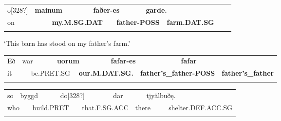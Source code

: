 \begin{tabular}{llllllllll}
\lsptoprule
o[328?] & \multicolumn{2}{l}{{\bfseries mainum}

} & \multicolumn{2}{l}{{\bfseries faðer-es }

} & \multicolumn{2}{l}{{\bfseries garde.}

} & \multicolumn{2}{l}{} & \\
\multicolumn{2}{l}{on

} & \multicolumn{2}{l}{{\bfseries my.M.SG.DAT}

} & \multicolumn{2}{l}{{\bfseries father-POSS}

} & \multicolumn{2}{l}{{\bfseries farm.DAT.SG}

} & \multicolumn{2}{l}{}\\
\lspbottomrule
\end{tabular}

\begin{styleTranslation}
‘This barn has stood on my father’s farm.’

\end{styleTranslation}

\begin{tabular}{llllllllll}
\lsptoprule
Eð & \multicolumn{2}{l}{war

} & \multicolumn{2}{l}{{\bfseries uorum}

} & \multicolumn{2}{l}{{\bfseries fafar-es}

} & \multicolumn{2}{l}{{\bfseries fafar}

} & \\
\multicolumn{2}{l}{it

} & \multicolumn{2}{l}{be.PRET.SG

} & \multicolumn{2}{l}{{\bfseries our.M.DAT.SG.}

} & \multicolumn{2}{l}{{\bfseries father’s\_father-POSS}

} & \multicolumn{2}{l}{{\bfseries father’s\_father}

}\\
\lspbottomrule
\end{tabular}

\begin{tabular}{llllllllll}
\lsptoprule
\footnotemark{}so & \multicolumn{2}{l}{byggd

} & \multicolumn{2}{l}{do[328?]

} & \multicolumn{2}{l}{dar

} & \multicolumn{2}{l}{tjyälbuðę.

} & \\
\multicolumn{2}{l}{who

} & \multicolumn{2}{l}{build.PRET

} & \multicolumn{2}{l}{that.F.SG.ACC

} & \multicolumn{2}{l}{there

} & \multicolumn{2}{l}{shelter.DEF.ACC.SG

}\\
\lspbottomrule
\end{tabular}

